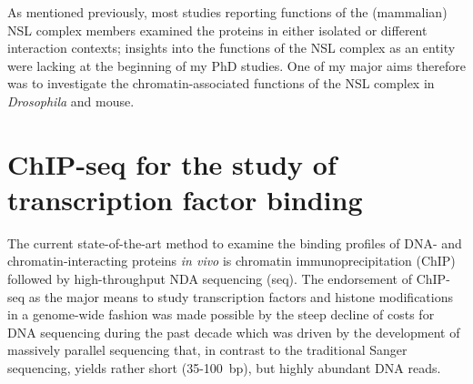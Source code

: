 As mentioned previously, most studies reporting functions of the (mammalian) NSL complex members examined the proteins in either isolated or different interaction contexts; insights into the functions of the NSL complex as an entity were lacking at the beginning of my PhD studies. One of my major aims therefore was to investigate the chromatin-associated functions of the NSL complex in \textit{Drosophila} and mouse.
\section{ChIP-seq for the study of transcription factor binding}
%
The current state-of-the-art method to examine the binding profiles of DNA- and chro\-ma\-tin-in\-ter\-acting proteins \textit{in vivo} is chromatin immunoprecipitation (ChIP) followed by high-throughput NDA sequencing (seq). The endorsement of ChIP-seq as the major means to study transcription factors and histone modifications in a genome-wide fashion was made possible by the steep decline of costs for DNA sequencing during the past decade which was driven by the development of massively parallel sequencing that, in contrast to the traditional Sanger sequencing, yields rather short (35-100~bp), but highly abundant DNA reads.
%
